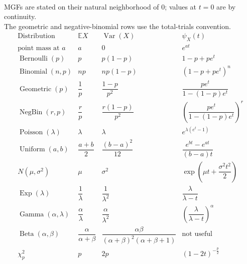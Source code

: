 \begin{method} \label{meth:common-moments-and-mgfs-table} \\
MGFs are stated on their natural neighborhood of $0$; values at $t=0$ are by continuity.\\
The geometric and negative-binomial rows use the total-trials convention.
\[
\begin{array}{c|c|c|c}
\text{Distribution} & \mathbb{E}X & \operatorname{Var}(X) & \psi_X(t)\\ \hline
\text{point mass at }a & a & 0 & e^{at}\\
\operatorname{Bernoulli}(p) & p & p(1-p) & 1-p+pe^t\\
\operatorname{Binomial}(n,p) & np & np(1-p) & (1-p+pe^t)^n\\
\operatorname{Geometric}(p) & \dfrac{1}{p} & \dfrac{1-p}{p^2} & \dfrac{pe^t}{1-(1-p)e^t}\\
\operatorname{NegBin}(r,p) & \dfrac{r}{p} & \dfrac{r(1-p)}{p^2} & \left(\dfrac{pe^t}{1-(1-p)e^t}\right)^r\\
\operatorname{Poisson}(\lambda) & \lambda & \lambda & e^{\lambda(e^t-1)}\\
\operatorname{Uniform}(a,b) & \dfrac{a+b}{2} & \dfrac{(b-a)^2}{12} & \dfrac{e^{bt}-e^{at}}{(b-a)t}\\
N(\mu,\sigma^2) & \mu & \sigma^2 & \exp(\mu t+\dfrac{\sigma^2t^2}{2})\\
\operatorname{Exp}(\lambda) & \dfrac{1}{\lambda} & \dfrac{1}{\lambda^2} & \dfrac{\lambda}{\lambda-t}\\
\operatorname{Gamma}(\alpha,\lambda) & \dfrac{\alpha}{\lambda} & \dfrac{\alpha}{\lambda^2} & \left(\dfrac{\lambda}{\lambda-t}\right)^\alpha\\
\operatorname{Beta}(\alpha,\beta) & \dfrac{\alpha}{\alpha+\beta} & \dfrac{\alpha\beta}{(\alpha+\beta)^2(\alpha+\beta+1)} & \text{not useful}\\
\chi_p^2 & p & 2p & (1-2t)^{-\frac{p}{2}}
\end{array}
\]
\end{method}
